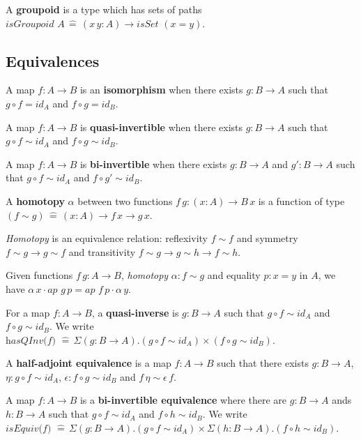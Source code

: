\documentclass[a4paper]{article}
\begin{document}
A \textbf{groupoid} is a type which has sets of paths $\textit{isGroupoid } A \, \hat{=} \, (x \, y : A) \to \textit{isSet }(x = y)$.

\subsection*{Equivalences}

A map $f : A \to B$ is an \textbf{isomorphism} when there exists $g : B \to A$ such that $g \circ f = \textit{id}_A$ and $f \circ g = \textit{id}_B$.

A map $f : A \to B$ is \textbf{quasi-invertible} when there exists $g : B \to A$ such that $g \circ f \sim \textit{id}_A$ and $f \circ g \sim \textit{id}_B$.

A map $f : A \to B$ is \textbf{bi-invertible} when there exists $g : B \to A$ and $g' : B \to A$ such that $g \circ f \sim \textit{id}_A$ and $f \circ g' \sim \textit{id}_B$.

A \textbf{homotopy} $\alpha$ between two functions $f \, g : (x : A) \to B \, x$ is a function of type $(f \sim g) \, \hat{=} \, (x : A) \to f \, x \to g \, x$.

\textit{Homotopy} is an equivalence relation: reflexivity $f \sim f$ and symmetry $f \sim g \to g \sim f$ and transitivity $f \sim g \to g \sim h \to f \sim h$.

Given functions $f \, g : A \to B$, \textit{homotopy} $\alpha : f \sim g$ and equality $p : x = y$ in $A$, we have $\alpha \, x \cdot \textit{ap } g \, p = \textit{ap } f \, p \cdot \alpha \, y$.

For a map $f : A \to B$, a \textbf{quasi-inverse} is $g : B \to A$ such that $g \circ f \sim \textit{id}_A$ and $f \circ g \sim \textit{id}_B$. We write $\textit{hasQInv(f) } \hat{=} \, \Sigma(g : B \to A).(g \circ f \sim \textit{id}_A) \times (f \circ g \sim \textit{id}_B)$.

A \textbf{half-adjoint equivalence} is a map $f : A \to B$ such that there exists $g : B \to A$, $\eta : g \circ f \sim \textit{id}_A$, $\epsilon : f \circ g \sim \textit{id}_B$ and $f \, \eta \sim \epsilon \, f$.

A map $f : A \to B$ is a \textbf{bi-invertible equivalence} where there are $g : B \to A$ ands $h : B \to A$ such that $g \circ f \sim \textit{id}_A$ and $f \circ h \sim \textit{id}_B$. We write $\textit{isEquiv(f) } \hat{=} \, \Sigma(g : B \to A).(g \circ f \sim \textit{id}_A) \times \Sigma(h : B \to A).(f \circ h \sim \textit{id}_B)$.
\end{document}
